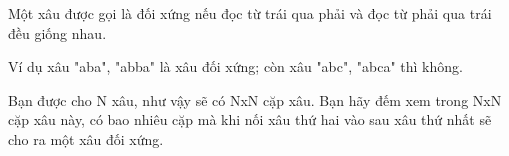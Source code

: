 Một xâu được gọi là đối xứng nếu đọc từ trái qua phải và đọc từ phải qua trái đều giống nhau.   


   Ví dụ xâu "aba", "abba" là xâu đối xứng; còn xâu "abc", "abca" thì không.   


   Bạn được cho N xâu, như vậy sẽ có NxN cặp xâu. Bạn hãy đếm xem trong NxN cặp xâu này, có bao nhiêu cặp mà khi nối xâu thứ hai vào sau xâu thứ nhất sẽ cho ra một xâu đối xứng.